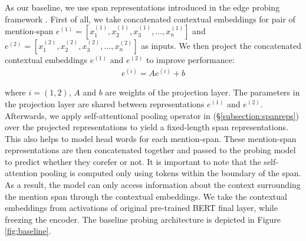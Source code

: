 \documentclass[11pt]{article}
\begin{document}



As our baseline, we use span representations introduced in the edge probing framework \parencite{tenney2019context}. First of all, we take concatenated contextual embeddings for pair of mention-span $e^{(1)} = [x_{1}^{(1)}, x_{2}^{(1)}, x_{3}^{(1)}, ..., x_{n}^{(1)}]$ and $e^{(2)} = [x_{1}^{(2)}, x_{2}^{(2)}, x_{3}^{(2)}, ..., x_{n}^{(2)}]$ as inputs. We then project the concatenated contextual embeddings $e^{(1)}$ and $e^{(2)}$ to improve performance:
\begin{align}
e^{(i)} = Ae^{(i)} + b
\end{align}

where $i = (1,2)$, $A$ and $b$ are weights of the projection layer. The parameters in the projection layer are shared between representations $e^{(1)}$ and $e^{(2)}$. Afterwards, we apply self-attentional pooling operator in (\S \ref{subsection:spanreps}) over the projected representations to yield a fixed-length span representations. This also helps to model head words for each mention-span. These mention-span representations are then concatenated together and passed to the probing model to predict whether they corefer or not. It is important to note that the self-attention pooling is computed only using tokens within the boundary of the span. As a result, the model can only access information about the context surrounding the mention span through the contextual embeddings. We take the contextual embeddings from activations of original pre-trained BERT final layer, while freezing the encoder. The baseline probing architecture is depicted in Figure \ref{fig:baseline}. 
\end{document}
